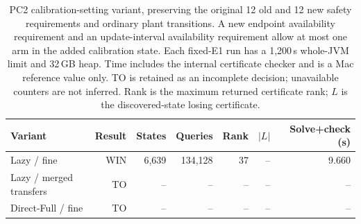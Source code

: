 \begin{table}[t]
\centering
\small
\begin{tabular}{lrrrrrr}
\toprule
Variant & Result & States & Queries & Rank & $|L|$ & Solve+check (s) \\
\midrule
Lazy / fine & WIN & 6,639 & 134,128 & 37 & -- & 9.660 \\
Lazy / merged transfers & TO & -- & -- & -- & -- & -- \\
Direct-Full / fine & TO & -- & -- & -- & -- & -- \\
\bottomrule
\end{tabular}
\caption{PC2 calibration-setting variant, preserving the original 12 old and 12 new safety requirements and ordinary plant transitions. A new endpoint availability requirement and an update-interval availability requirement allow at most one arm in the added calibration state. Each fixed-E1 run has a 1,200\,s whole-JVM limit and 32\,GB heap. Time includes the internal certificate checker and is a Mac reference value only. TO is retained as an incomplete decision; unavailable counters are not inferred. Rank is the maximum returned certificate rank; $L$ is the discovered-state losing certificate.}
\label{tab:e6-pc2-calibration}
\end{table}

